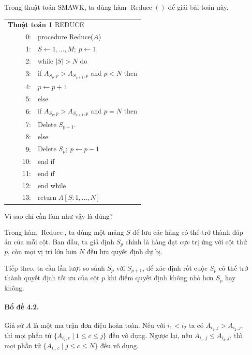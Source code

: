 \documentclass[11pt]{article}
\begin{document}
Trong thuật toán SMAWK, ta dùng hàm \(\operatorname{Reduce}()\) để giải bài
toán này.

\begin{center}
\small
\begin{tabular}{r@{\quad}p{0.78\linewidth}}
\multicolumn{2}{l}{\textbf{Thuật toán 1} REDUCE}\\
0: & procedure Reduce(\(A\))\\
1: & \quad \(S\leftarrow 1,\ldots,M;\ p\leftarrow 1\)\\
2: & \quad while \(|S|>N\) do\\
3: & \qquad if \(A_{S_p,p}>A_{S_{p+1},p}\) and \(p<N\) then\\
4: & \qquad\quad \(p\leftarrow p+1\)\\
5: & \qquad else\\
6: & \qquad\quad if \(A_{S_p,p}>A_{S_{p+1},p}\) and \(p=N\) then\\
7: & \qquad\qquad Delete \(S_{p+1}\).\\
8: & \qquad\quad else\\
9: & \qquad\qquad Delete \(S_p;\ p\leftarrow p-1\)\\
10: & \qquad\quad end if\\
11: & \qquad end if\\
12: & \quad end while\\
13: & \quad return \(A[S:1,\ldots,N]\)
\end{tabular}
\end{center}

Vì sao chỉ cần làm như vậy là đúng?

Trong hàm \(\operatorname{Reduce}\), ta dùng một mảng \(S\) để lưu các hàng có
thể trở thành đáp án của mỗi cột. Ban đầu, ta giả định \(S_p\) chính là hàng
đạt cực trị ứng với cột thứ \(p\), còn mọi vị trí lớn hơn \(N\) đều lưu quyết
định dự bị.

Tiếp theo, ta cần lần lượt so sánh \(S_p\) với \(S_{p+1}\), để xác định rốt
cuộc \(S_p\) có thể trở thành quyết định tối ưu của cột \(p\) khi điểm quyết
định không nhỏ hơn \(S_p\) hay không.

\paragraph{Bổ đề 4.2.}
Giả sử \(A\) là một ma trận đơn điệu hoàn toàn. Nếu với \(i_1<i_2\) ta có
\(A_{i_1,j}>A_{i_2,j}\), thì mọi phần tử
\(\{A_{i_2,c}\mid 1\le c\le j\}\) đều vô dụng. Ngược lại, nếu
\(A_{i_1,j}\le A_{i_2,j}\), thì mọi phần tử
\(\{A_{i_1,c}\mid j\le c\le N\}\) đều vô dụng.
\end{document}

